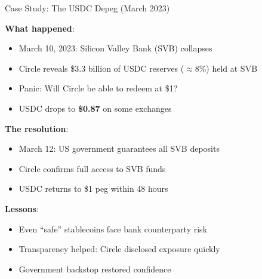 \documentclass[10pt]{beamer}
\newcommand{\highlight}[1]{\textcolor{AccentOrange}{\textbf{#1}}}
\begin{document}
\begin{frame}{Case Study: The USDC Depeg (March 2023)}
  
  \textbf{What happened}:
  \begin{itemize}
    \item March 10, 2023: Silicon Valley Bank (SVB) collapses
    \item Circle reveals \$3.3 billion of USDC reserves ($\approx$8\%) held at SVB
    \item Panic: Will Circle be able to redeem at \$1?
    \item USDC drops to \highlight{\$0.87} on some exchanges
  \end{itemize}
  
  \vspace{0.5em}
  \textbf{The resolution}:
  \begin{itemize}
    \item March 12: US government guarantees all SVB deposits
    \item Circle confirms full access to SVB funds
    \item USDC returns to \$1 peg within 48 hours
  \end{itemize}
  
  \vspace{0.5em}
  \textbf{Lessons}:
  \begin{itemize}
    \item Even ``safe'' stablecoins face bank counterparty risk
    \item Transparency helped: Circle disclosed exposure quickly
    \item Government backstop restored confidence
  \end{itemize}
\end{frame}
\end{document}
